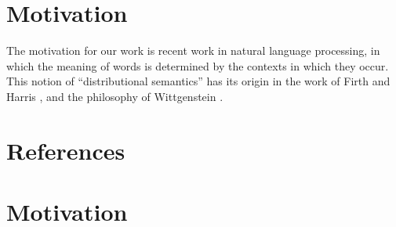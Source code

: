 \documentclass[preprint,leqno]{elsarticle}
\begin{document}
\section{Motivation}

The motivation for our work is recent work in natural language
processing, in which the meaning of words is determined by the
contexts in which they occur. This notion of ``distributional
semantics'' has its origin in the work of Firth \cite{Firth:57} and
Harris \cite{Harris:68}, and the philosophy of Wittgenstein
\cite{Wittgenstein:53}.

\section*{References}





\section{Motivation}
\end{document}
